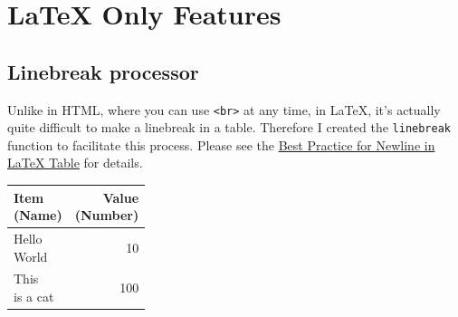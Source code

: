 \documentclass[table]{article}
\newenvironment{Shaded}{\begin{snugshade}}{\end{snugshade}}
\newcommand{\CharTok}[1]{\textcolor[rgb]{0.31,0.60,0.02}{#1}}
\newcommand{\DataTypeTok}[1]{\textcolor[rgb]{0.13,0.29,0.53}{#1}}
\newcommand{\DecValTok}[1]{\textcolor[rgb]{0.00,0.00,0.81}{#1}}
\newcommand{\KeywordTok}[1]{\textcolor[rgb]{0.13,0.29,0.53}{\textbf{#1}}}
\newcommand{\NormalTok}[1]{#1}
\newcommand{\OperatorTok}[1]{\textcolor[rgb]{0.81,0.36,0.00}{\textbf{#1}}}
\newcommand{\StringTok}[1]{\textcolor[rgb]{0.31,0.60,0.02}{#1}}
\begin{document}
\hypertarget{latex-only-features}{%
\section{LaTeX Only Features}\label{latex-only-features}}

\hypertarget{linebreak-processor}{%
\subsection{Linebreak processor}\label{linebreak-processor}}

Unlike in HTML, where you can use \texttt{\textless{}br\textgreater{}}
at any time, in LaTeX, it's actually quite difficult to make a linebreak
in a table. Therefore I created the \texttt{linebreak} function to
facilitate this process. Please see the
\href{http://haozhu233.github.io/kableExtra/best_practice_for_newline_in_latex_table.pdf}{Best
Practice for Newline in LaTeX Table} for details.

\begin{Shaded}
\end{Shaded}

\begin{tabular}{lr}
\toprule
\makecell[c]{Item\\(Name)} & \makecell[c]{Value\\(Number)}\\
\midrule
\makecell[l]{Hello\\World} & 10\\
\makecell[l]{This\\is a cat} & 100\\
\bottomrule
\end{tabular}
\end{document}
